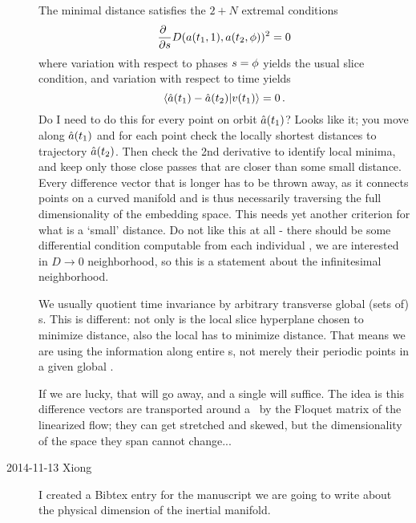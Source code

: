 \begin{description}
The minimal distance satisfies the $2+N$ extremal conditions
\[
\frac{\partial~}{\partial s}
D(a(t_1,1),a(t_2,{\bf \phi}))^2= 0
\]
where variation with respect to phases $s={\bf \phi}$ yields the usual
slice condition, and variation with respect to time yields
\[
\braket{\sspRed(\zeit_1)
      -\sspRed(\zeit_2)}{\vel(\zeit_1)} = 0
\,.
\]
Do I need to do this for every point on orbit $\hat{a}(t_1)$? Looks
like it; you move along $\hat{a}(t_1)$ and for each point
check the locally shortest distances to trajectory
$\hat{a}(t_2)$. Then check the 2nd derivative to identify local minima, and keep
only those close passes that are closer than some small distance. Every difference
vector that is longer has to be thrown away, as it connects points on a curved
manifold and is thus necessarily traversing the full dimensionality of
the embedding space. This needs
yet another criterion for what is a `small' distance. Do not like this at all -
there should be some differential condition computable from each individual
\po, we are interested in $D\to 0$ neighborhood,
so this is a statement about the infinitesimal neighborhood.

We usually quotient time invariance by arbitrary transverse global
(sets of) {\PoincSec s}. This is different: not only is the local slice
hyperplane chosen to minimize distance, also the local {\PoincSec} has
to minimize distance. That means we are using the information along
entire \po s, not merely their periodic points in a given global
{\PoincSec}.

If we are lucky, that will go away, and a single {\PoincSec} will
suffice. The idea is this difference vectors are transported around a
\po\ by the Floquet matrix of the linearized flow; they can get stretched and
skewed, but the dimensionality of the space they span cannot change...

\item[2014-11-13 Xiong] I created a Bibtex entry
  for the manuscript we
  are going to write about the physical dimension of the inertial manifold.


\end{description}
